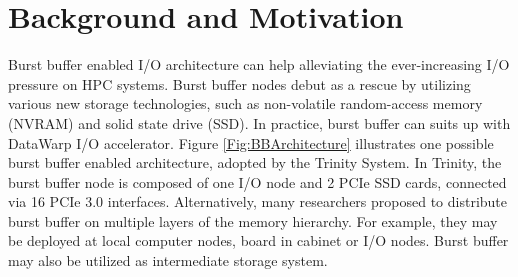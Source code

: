 \section{Background and Motivation}
\label{Sec:Background}

Burst buffer enabled I/O architecture can help alleviating
the ever-increasing I/O pressure on HPC systems.
Burst buffer nodes debut as a rescue by utilizing various new storage technologies,
such as non-volatile random-access memory (NVRAM) and solid state drive (SSD).
In practice, burst buffer can suits up with DataWarp I/O accelerator\cite{DataWarp}.
Figure \ref{Fig:BBArchitecture} illustrates one possible burst buffer enabled architecture,
adopted by the Trinity System\cite{TrinitySystem}.
In Trinity, the burst buffer node is composed of one I/O node and 2 PCIe SSD cards,
connected via 16 PCIe 3.0 interfaces.
Alternatively, many researchers proposed to distribute burst buffer 
on multiple layers of the memory hierarchy\cite{Romanus:CORR:15}.
For example, they may be deployed at local computer nodes, board in cabinet or I/O nodes.
Burst buffer may also be utilized as intermediate storage system.

